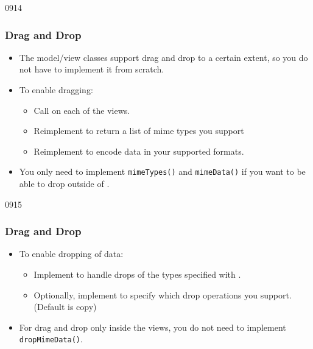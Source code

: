 \begin{slide}{0914}\frametitle{Drag and Drop}\label{model_view_dragndrop}
\begin{itemize}
\item The model/view classes support drag and drop to a certain extent, so
  you do not have to implement it from scratch.
\item To enable dragging:
  \begin{itemize}
  \item Call  on each of
    the views.
  \item Reimplement  to return a
    list of mime types you support
  \item Reimplement  to encode data
    in your supported formats.
  \end{itemize}
\item You only need to implement \texttt{mimeTypes()} and
  \texttt{mimeData()} if you want to be able to drop outside of
  .
\end{itemize}
\end{slide}

\begin{slide}{0915}\frametitle{Drag and Drop}
\begin{itemize}
\item To enable dropping of data:
  \begin{itemize}
  \item Implement  to handle
    drops of the types specified with
    .
  \item Optionally, implement  to specify
    which drop operations you support. (Default is copy)
  \end{itemize}
\item For drag and drop only inside the views, you do not need to implement
  \texttt{dropMimeData()}.
\end{itemize}
\end{slide}
